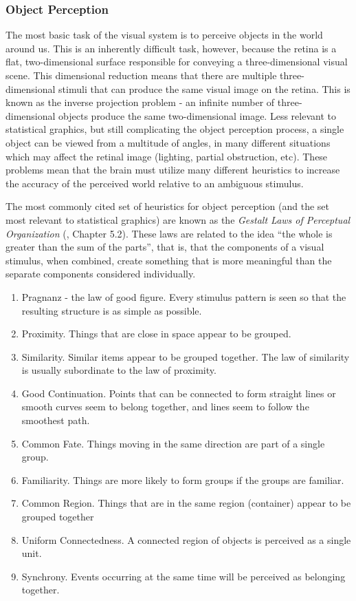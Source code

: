 \documentclass[11pt]{isuthesis}
\begin{document}
\subsubsection{Object Perception} \label{ObjectPerception}
The most basic task of the visual system is to perceive objects in the world around us. This is an inherently difficult task, however, because the retina is a flat, two-dimensional surface responsible for conveying a three-dimensional visual scene. This dimensional reduction means that there are multiple three-dimensional stimuli that can produce the same visual image on the retina. This is known as the inverse projection problem - an infinite number of three-dimensional objects produce the same two-dimensional image. Less relevant to statistical graphics, but still complicating the object perception process, a single object can be viewed from a multitude of angles, in many different situations which may affect the retinal image (lighting, partial obstruction, etc). These problems mean that the brain must utilize many different heuristics to increase the accuracy of the perceived world relative to an ambiguous stimulus. 

The most commonly cited set of heuristics for object perception (and the set most relevant to statistical graphics) are known as the \emph{Gestalt Laws of Perceptual Organization} (\citealt{goldstein}, Chapter 5.2). These laws are related to the idea ``the whole is greater than the sum of the parts'', that is, that the components of a visual stimulus, when combined, create something that is more meaningful than the separate components considered individually. 

\begin{enumerate}
\item Pragnanz - the law of good figure. Every stimulus pattern is seen so that the resulting structure is as simple as possible. 
\item Proximity. Things that are close in space appear to be grouped. 
\item Similarity. Similar items appear to be grouped together. The law of similarity is usually subordinate to the law of proximity. 
\item Good Continuation. Points that can be connected to form straight lines or smooth curves seem to belong together, and lines seem to follow the smoothest path. 
\item Common Fate. Things moving in the same direction are part of a single group.
\item Familiarity. Things are more likely to form groups if the groups are familiar. 
\item Common Region. Things that are in the same region (container) appear to be grouped together
\item Uniform Connectedness. A connected region of objects is perceived as a single unit.
\item Synchrony. Events occurring at the same time will be perceived as belonging together.
\end{enumerate}
\end{document}
